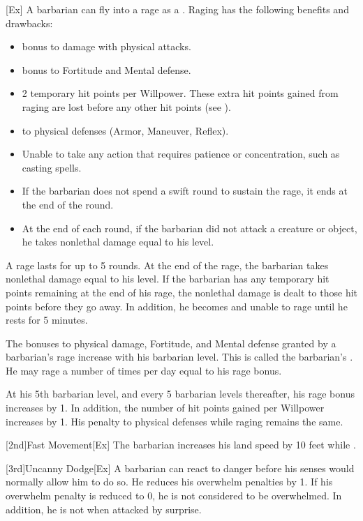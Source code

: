         [Ex]\label{Rage}
        A barbarian can fly into a rage as a .
        Raging has the following benefits and drawbacks:
        \begin{itemize}
            \item {} bonus to damage with physical attacks.
            \item {} bonus to Fortitude and Mental defense.
            \item 2 temporary hit points per Willpower.
                These extra hit points gained from raging are lost before any other hit points (see ).
            \item {} to physical defenses (Armor, Maneuver, Reflex).
            \item Unable to take any action that requires patience or concentration, such as casting spells.
            \item If the barbarian does not spend a swift round to sustain the rage, it ends at the end of the round.
            \item At the end of each round, if the barbarian did not attack a creature or object, he takes nonlethal damage equal to his level.
        \end{itemize}

        A rage lasts for up to 5 rounds.
        At the end of the rage, the barbarian takes nonlethal damage equal to his level.
        If the barbarian has any temporary hit points remaining at the end of his rage, the nonlethal damage is dealt to those hit points before they go away.
        In addition, he becomes \fatigued and unable to rage until he rests for 5 minutes.

        The bonuses to physical damage, Fortitude, and Mental defense granted by a barbarian's rage increase with his barbarian level.
        This is called the barbarian's .
        He may rage a number of times per day equal to his rage bonus.

        At his 5th barbarian level, and every 5 barbarian levels thereafter, his rage bonus increases by 1.
        In addition, the number of hit points gained per Willpower increases by 1.
        His penalty to physical defenses while raging remains the same.

        [2nd]{Fast Movement}[Ex]
        The barbarian increases his land speed by 10 feet while \unencumbered.

        [3rd]{Uncanny Dodge}[Ex]
        A barbarian can react to danger before his senses would normally allow him to do so.
        He reduces his overwhelm penalties by 1.
        If his overwhelm penalty is reduced to 0, he is not considered to be overwhelmed.
        In addition, he is not \unaware when attacked by surprise.

